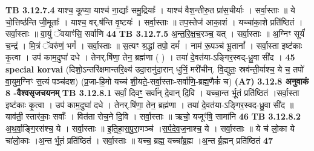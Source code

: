 \documentclass[17pt]{extarticle}
\begin{document}
{{{{{{{{{{{{{{{{{{{{{{{                                \textbf{ TB 3.12.7.4} \newline
                  याश्च॒ कूप्या॒ याश्च॑ ना॒द्याः᳚ समु॒द्रियाः᳚ । याश्च॑ वैश॒न्तीरु॒त प्रा॑स॒चीर्याः । सर्वा॒स्ताः ॥ ये चो॒त्तिष्ठ॑न्ति जी॒मूताः᳚ । याश्च॒ वर्.ष॑न्ति वृ॒ष्टयः॑ । सर्वा॒स्ताः ॥ तप॒स्तेज॑ आका॒शं । यच्चा॑का॒शे प्रति॑ष्ठितं । सर्वा॒स्ताः ॥ वा॒युं ॅवयाꣳ॑सि॒ सर्वा॑णि \textbf{ 44} \newline
                  \newline
                                \textbf{ TB 3.12.7.5} \newline
                  अ॒न्त॒रि॒क्ष॒च॒रञ्च॒ यत् । सर्वा॒स्ताः ॥ अ॒ग्निꣳ सूर्यं॑ च॒न्द्रं । मि॒त्रं ॅवरु॑णं॒ भगं᳚ । सर्वा॒स्ताः ॥ स॒त्यꣳ श्र॒द्धां तपो॒ दमं᳚ । नाम॑ रू॒पञ्च॑ भू॒तानां᳚ । सर्वा॒स्ता इष्ट॑काः कृ॒त्वा । उप॑ काम॒दुघा॑ दधे । तेनर्.षि॑णा॒ तेन॒ ब्रह्म॑णा ( ) । तया॑ दे॒वत॑या-ऽङ्गिर॒स्वद्-ध्रु॒वा सी॑द । \textbf{ 45} \newline
                  \newline
                                                        \textbf{special korvai} \newline
              (दिशो॒ऽन्तरि॑क्षमान्तरि॒क्ष्य॑ उदा॒रानु॑दा॒रान् धुनिं॒ मरी॑चीन्. वि॒द्युतः॒ स्रव॑न्ती॒र्याश्च॒ ये च॒ तपो॑ वा॒युम॒ग्निꣳ स॒त्यं पञ्च॑दश) \newline
                                (प्र॒जा-हि॒मो यच्च॑ शी॒यते॒-सर्वा॒स्ताः-सर्वा॑णि॒-ब्रह्म॒णैकं॑ च) \textbf{(A7)} \newline \newline
                \textbf{ 3.12.8    अनुवाकं   8 -वैश्वसृजचयनम्} \newline
                                \textbf{ TB 3.12.8.1} \newline
                  सर्वां॒ दिवꣳ॒॒ सर्वा᳚न् दे॒वान् दि॒वि । यच्चा॒न्त र्भू॒तं प्रति॑ष्ठितं ।सर्वा॒स्ता इष्ट॑काः कृ॒त्वा । उप॑ काम॒दुघा॑ दधे । तेनर्.षि॑णा॒ तेन॒ ब्रह्म॑णा । तया॑ दे॒वत॑या-ऽङ्गिर॒स्वद-ध्रु॒वा सी॑द ॥ याव॑ती॒ स्तार॑काः॒ सर्वाः᳚ । वित॑ता रोच॒ने दि॒वि । सर्वा॒स्ताः ॥ ऋचो॒ यजूꣳ॑षि॒ सामा॑नि \textbf{ 46} \newline
                  \newline
                                \textbf{ TB 3.12.8.2} \newline
                  अ॒थ॒र्वा॒ङ्गि॒रस॑श्च॒ ये । सर्वा॒स्ताः ॥ इ॒ति॒हा॒स॒पु॒रा॒णञ्च॑ ।स॒र्प॒दे॒व॒ज॒नाश्च॒ ये । सर्वा॒स्ताः ॥ ये च॑ लो॒का ये चा॑लो॒काः ।अ॒न्त र्भू॒तं प्रति॑ष्ठितं । सर्वा॒स्ताः ॥ यच्च॒ ब्रह्म॒ यच्चा᳚ब्र॒ह्म ।अ॒न्त र्ब्र॒ह्मन् प्रति॑ष्ठितं \textbf{ 47} \newline
}}}}}}}}}}}}}}}}}}}}}}}
\end{document}
